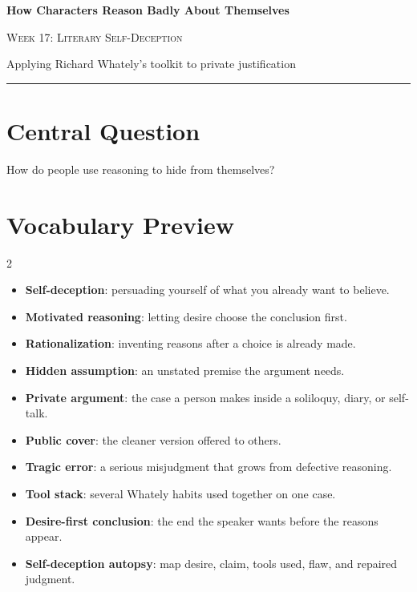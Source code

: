 \documentclass[12pt]{article}
\begin{document}
\begin{center}
{\LARGE\bfseries How Characters Reason Badly About Themselves}\par\vspace{0.25em}
{\large\scshape Week 17: Literary Self-Deception}\par\vspace{0.5em}
{Applying Richard Whately's toolkit to private justification}\par\vspace{0.6em}
\rule{0.82\textwidth}{0.4pt}
\end{center}

\section*{Central Question}
How do people use reasoning to hide from themselves?

\section*{Vocabulary Preview}
\begin{multicols}{2}
\begin{itemize}[leftmargin=*, itemsep=0.18em]
\item \textbf{Self-deception}: persuading yourself of what you already want to believe.
\item \textbf{Motivated reasoning}: letting desire choose the conclusion first.
\item \textbf{Rationalization}: inventing reasons after a choice is already made.
\item \textbf{Hidden assumption}: an unstated premise the argument needs.
\item \textbf{Private argument}: the case a person makes inside a soliloquy, diary, or self-talk.
\item \textbf{Public cover}: the cleaner version offered to others.
\item \textbf{Tragic error}: a serious misjudgment that grows from defective reasoning.
\item \textbf{Tool stack}: several Whately habits used together on one case.
\item \textbf{Desire-first conclusion}: the end the speaker wants before the reasons appear.
\item \textbf{Self-deception autopsy}: map desire, claim, tools used, flaw, and repaired judgment.
\end{itemize}
\end{multicols}
\end{document}
